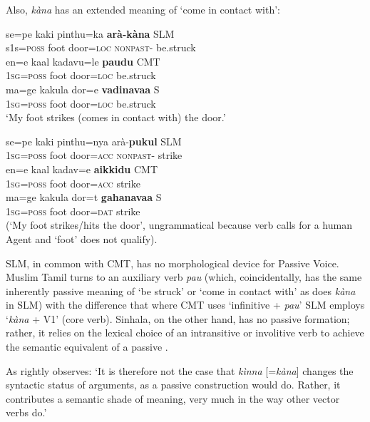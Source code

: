 Also, \textit{kàna} has an extended meaning of `come in contact with': 

\ea\label{jaffar:ex:35}
\ea
\gll se=pe kaki pinthu=ka \textbf{arà-kàna}  SLM \\
 s1s=\textsc{poss} foot door=\textsc{loc}  \textsc{nonpast}- be.struck \\
\ex%
\gll en{\dz}=e kaal kadavu=le \textbf{pa{\dz}udu}  CMT \\
 1\textsc{sg}=\textsc{poss} foot door=\textsc{loc}  be.struck \\
\ex%
\gll ma=ge kakula dor=e \textbf{vadinavaa}  S \\
 1\textsc{sg}=\textsc{poss} foot door=\textsc{loc}  be.struck \\
 `My foot strikes (comes in contact with) the door.'
\z
\z



\ea\label{jaffar:ex:38}
\ea
\gll *se=pe  kaki pinthu=nya arà-\textbf{pukul}  SLM \\
 1\textsc{sg}=\textsc{poss} foot door=\textsc{acc}  \textsc{nonpast}- strike\\
\ex%
\gll *en={\dz}e kaal kadav=e \textbf{a{\dz}ikkidu} CMT \\
1\textsc{sg}=\textsc{poss} foot door=\textsc{acc}  strike\\
\ex%
\gll *ma=ge  kakula dor{\E}=t{\E} \textbf{gahanavaa}  S \\
 1\textsc{sg}=\textsc{poss} foot door=\textsc{dat}  strike\\
 (`My foot strikes/hits the door', ungrammatical because verb calls for a human Agent and `foot' does not qualify).
\z
\z 

SLM, in common with CMT, has no morphological device for Passive Voice. Muslim Tamil turns to an auxiliary verb \textit{pa{\dz}u} (which, coincidentally, has the same inherently passive meaning of `be struck' or `come in contact with' as does \textit{kàna} in SLM) with the difference that where CMT uses `infinitive + \textit{pa{\dz}u}' SLM employs `\textit{kàna} + V1' (core verb). Sinhala, on the other hand, has no passive formation; rather, it relies on the lexical choice of an intransitive or involitive verb to achieve the semantic equivalent of a passive \citep[39]{GairEtAl1997}.

As \citet[188]{Nordhoff2009} rightly observes: 
`It is therefore not the case that \textit{kìnna} [=\textit{kàna}] changes the syntactic status of arguments, as a passive construction would do. Rather, it contributes a semantic shade of meaning, very much in the way other vector verbs do.' 

